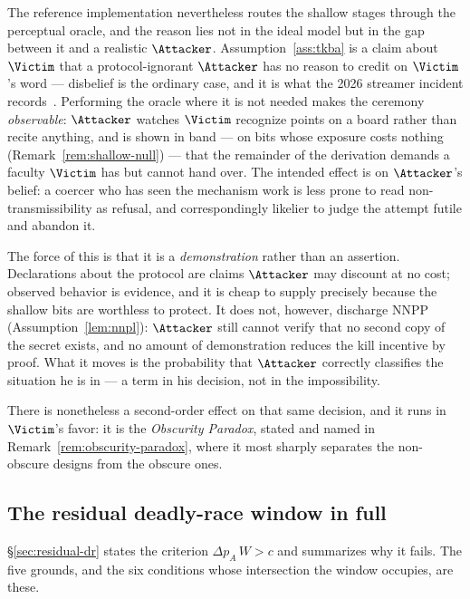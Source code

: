 \begin{remark}
\label{rem:adversary-education}
The reference implementation nevertheless routes the shallow stages through the
perceptual oracle, and the reason lies not in the ideal model but in the gap
between it and a realistic $\Attacker$. Assumption~\ref{ass:tkba} is a claim
about $\Victim$ that a protocol-ignorant $\Attacker$ has no reason to credit on
$\Victim$'s word --- disbelief is the ordinary case, and it is what the
2026 streamer incident records~\cite{ratirl}. Performing the oracle where it is
not needed makes the ceremony \emph{observable}: $\Attacker$ watches $\Victim$
recognize points on a board rather than recite anything, and is shown in band ---
on bits whose exposure costs nothing (Remark~\ref{rem:shallow-null}) --- that the
remainder of the derivation demands a faculty $\Victim$ has but cannot hand over.
The intended effect is on $\Attacker$'s belief: a coercer who has seen the
mechanism work is less prone to read non-transmissibility as refusal, and
correspondingly likelier to judge the attempt futile and abandon it.

The force of this is that it is a \emph{demonstration} rather than an assertion.
Declarations about the protocol are claims $\Attacker$ may discount at no cost;
observed behavior is evidence, and it is cheap to supply precisely because the
shallow bits are worthless to protect. It does not, however, discharge NNPP
(Assumption~\ref{lem:nnpl}): $\Attacker$ still cannot verify that no second copy
of the secret exists, and no amount of demonstration reduces the kill incentive
by proof. What it moves is the probability that $\Attacker$ correctly classifies
the situation he is in --- a term in his decision, not in the impossibility.

There is nonetheless a second-order effect on that same decision, and it runs in
$\Victim$'s favor: it is the \emph{Obscurity Paradox}, stated and named in
Remark~\ref{rem:obscurity-paradox}, where it most sharply separates the
non-obscure designs from the obscure ones.
\end{remark}

\subsection{The residual deadly-race window in full}
\label{app:tgpo-residual}

\noindent \S\ref{sec:residual-dr} states the criterion $\Delta p_A\,W > c$ and
summarizes why it fails. The five grounds, and the six conditions whose
intersection the window occupies, are these.


